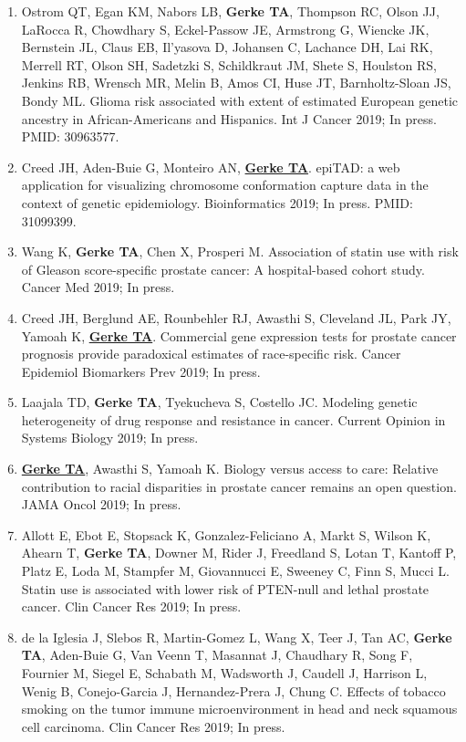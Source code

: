 \documentclass[11pt, a4paper]{article} %
\begin{document}
\begin{enumerate}[leftmargin=*]
\item{} Ostrom QT, Egan KM, Nabors LB, {\bf Gerke TA}, Thompson RC, Olson JJ, LaRocca R, Chowdhary S, Eckel-Passow JE, Armstrong G, Wiencke JK, Bernstein JL, Claus EB, Il'yasova D, Johansen C, Lachance DH, Lai RK, Merrell RT, Olson SH, Sadetzki S, Schildkraut JM, Shete S, Houlston RS, Jenkins RB, Wrensch MR, Melin B, Amos CI, Huse JT, Barnholtz-Sloan JS, Bondy ML. Glioma risk associated with extent of estimated European genetic ancestry in African-Americans and Hispanics. Int J Cancer 2019; In press. PMID: 30963577.

\item{} Creed JH, Aden-Buie G, Monteiro AN, \underline{{\bf Gerke TA}}. epiTAD: a web application for visualizing chromosome conformation capture data in the context of genetic epidemiology. Bioinformatics 2019; In press. PMID: 31099399. 

\item{} Wang K, {\bf Gerke TA}, Chen X, Prosperi M. Association of statin use with risk of Gleason score-specific prostate cancer: A hospital-based cohort study. Cancer Med 2019; In press.

\item{} Creed JH, Berglund AE, Rounbehler RJ, Awasthi S, Cleveland JL, Park JY, Yamoah K, \underline{{\bf Gerke TA}}. Commercial gene expression tests for prostate cancer prognosis provide paradoxical estimates of race-specific risk. Cancer Epidemiol Biomarkers Prev 2019; In press.

\item{} Laajala TD, {\bf Gerke TA}, Tyekucheva S, Costello JC. Modeling genetic heterogeneity of drug response and resistance in cancer. Current Opinion in Systems Biology 2019; In press.

\item{} \underline{{\bf Gerke TA}}, Awasthi S, Yamoah K. Biology versus access to care: Relative contribution to racial disparities in prostate cancer remains an open question. JAMA Oncol 2019; In press.

\item{} Allott E, Ebot E, Stopsack K, Gonzalez-Feliciano A, Markt S, Wilson K, Ahearn T, {\bf Gerke TA}, Downer M, Rider J, Freedland S, Lotan T, Kantoff P, Platz E, Loda M, Stampfer M, Giovannucci E, Sweeney C, Finn S, Mucci L. Statin use is associated with lower risk of PTEN-null and lethal prostate cancer. Clin Cancer Res 2019; In press.

\item{} de la Iglesia J, Slebos R, Martin-Gomez L, Wang X, Teer J, Tan AC, {\bf Gerke TA}, Aden-Buie G, Van Veenn T, Masannat J, Chaudhary R, Song F, Fournier M, Siegel E, Schabath M, Wadsworth J, Caudell J, Harrison L, Wenig B, Conejo-Garcia J, Hernandez-Prera J, Chung C. Effects of tobacco smoking on the tumor immune microenvironment in head and neck squamous cell carcinoma. Clin Cancer Res 2019; In press.


\end{enumerate}
\end{document}
